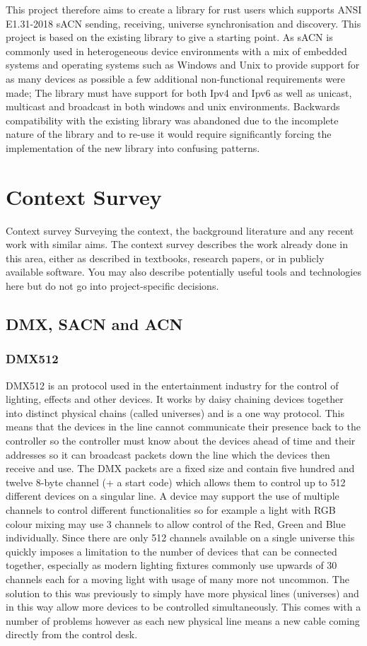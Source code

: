 \documentclass[11pt,a4paper]{report}
\begin{document}
	This project therefore aims to create a library for rust users which supports ANSI E1.31-2018 sACN sending, receiving, universe synchronisation and discovery. This project is based on the existing library to give a starting point. As sACN is commonly used in heterogeneous device environments with a mix of embedded systems and operating systems such as Windows and Unix to provide support for as many devices as possible a few additional non-functional requirements were made; The library must have support for both Ipv4 and Ipv6 as well as unicast, multicast and broadcast in both windows and unix environments. Backwards compatibility with the existing library was abandoned due to the incomplete nature of the library and to re-use it would require significantly forcing the implementation of the new library into confusing patterns.\\
	
	\section{Context Survey}
	Context survey
	Surveying the context, the background literature and
	any recent work with similar aims. The context survey
	describes the work already done in this area, either as
	described in textbooks, research papers, or in publicly
	available software. You may also describe potentially
	useful tools and technologies here but do not go into
	project-specific decisions.
	
	\subsection{DMX, SACN and ACN}
	\subsubsection{DMX512} DMX512 is an protocol used in the entertainment industry for the control of lighting, effects and other devices. It works by daisy chaining devices together into distinct physical chains (called universes) and is a one way protocol. This means that the devices in the line cannot communicate their presence back to the controller so the controller must know about the devices ahead of time and their addresses so it can broadcast packets down the line which the devices then receive and use. The DMX packets are a fixed size and contain five hundred and twelve 8-byte channel (+ a start code) which allows them to control up to 512 different devices on a singular line. A device may support the use of multiple channels to control different functionalities so for example a light with RGB colour mixing may use 3 channels to allow control of the Red, Green and Blue individually. Since there are only 512 channels available on a single universe this quickly imposes a limitation to the number of devices that can be connected together, especially as modern lighting fixtures commonly use upwards of 30 channels each for a moving light with usage of many more not uncommon. The solution to this was previously to simply have more physical lines (universes) and in this way allow more devices to be controlled simultaneously. This comes with a number of problems however as each new physical line means a new cable coming directly from the control desk.
	
\end{document}
